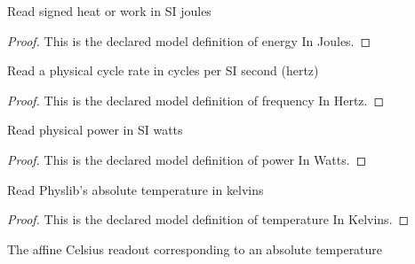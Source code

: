 \begin{definition}
  \label{def:physics:phyx-mini-0481:phyxminiproblems-problemphyxmini0481-energyinjoules}
  Read signed heat or work in SI joules
\end{definition}
\begin{proof}
  This is the declared model definition of energy In Joules.
\end{proof}
\begin{definition}
  \label{def:physics:phyx-mini-0481:phyxminiproblems-problemphyxmini0481-frequencyinhertz}
  Read a physical cycle rate in cycles per SI second (hertz)
\end{definition}
\begin{proof}
  This is the declared model definition of frequency In Hertz.
\end{proof}
\begin{definition}
  \label{def:physics:phyx-mini-0481:phyxminiproblems-problemphyxmini0481-powerinwatts}
  Read physical power in SI watts
\end{definition}
\begin{proof}
  This is the declared model definition of power In Watts.
\end{proof}
\begin{definition}
  \label{def:physics:phyx-mini-0481:phyxminiproblems-problemphyxmini0481-temperatureinkelvins}
  Read Physlib's absolute temperature in kelvins
\end{definition}
\begin{proof}
  This is the declared model definition of temperature In Kelvins.
\end{proof}
\begin{definition}
  \label{def:physics:phyx-mini-0481:phyxminiproblems-problemphyxmini0481-temperatureindegreescelsius}
  The affine Celsius readout corresponding to an absolute temperature
\end{definition}
